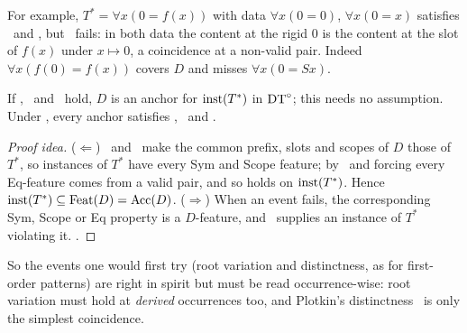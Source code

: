 For example, $T^*=\forall x(0=f(x))$ with data $\forall x(0=0)$, $\forall x(0=x)$ satisfies \evRs\ and \evN, but \evU\ fails: in both data the content at the rigid $0$ is the content at the slot of $f(x)$ under $x\mapsto0$, a coincidence at a non-valid pair. Indeed $\forall x(f(0)=f(x))$ covers $D$ and misses $\forall x(0=Sx)$.

\begin{theorem}\label{thm:single:anchor}
If \evRs, \evN\ and \evU\ hold, $D$ is an anchor for $\mathrm{inst}(T^*)$ in $\mathrm{DT}^{\circ}$; this needs no assumption. Under \Rich, every anchor satisfies \evRs, \evN\ and \evU.
\end{theorem}

\begin{proof}[Proof idea]
($\Leftarrow$) \evRs\ and \evN\ make the common prefix, slots and scopes of $D$ those of $T^*$, so instances of $T^*$ have every Sym and Scope feature; by \evU\ and forcing every Eq-feature comes from a valid pair, and so holds on $\mathrm{inst}(T^*)$. Hence $\mathrm{inst}(T^*)\subseteq\mathrm{Feat}(D)=\mathrm{Acc}(D)$. ($\Rightarrow$) When an event fails, the corresponding Sym, Scope or Eq property is a $D$-feature, and \Rich\ supplies an instance of $T^*$ violating it. .
\end{proof}

So the events one would first try (root variation and distinctness, as for first-order patterns) are right in spirit but must be read occurrence-wise: root variation must hold at \emph{derived} occurrences too, and Plotkin's distinctness \evD\ is only the simplest coincidence.

